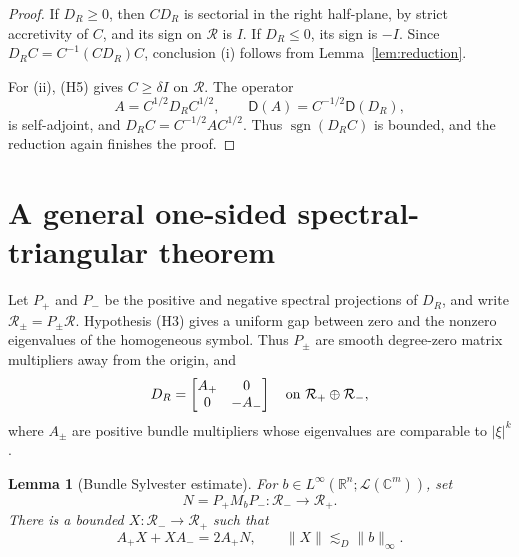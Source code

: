 \documentclass[11pt]{article}
\newtheorem{lemma}{Lemma}
\newcommand{\Rr}{\mathcal R}
\newcommand{\Dom}{\mathsf D}
\newcommand{\sgn}{\operatorname{sgn}}
\begin{document}
\begin{proof}
If $D_R\geq0$, then $CD_R$ is sectorial in the right half-plane, by strict
accretivity of $C$, and its sign on $\Rr$ is $I$. If $D_R\leq0$, its sign is
$-I$. Since $D_RC=C^{-1}(CD_R)C$, conclusion (i) follows from
Lemma~\ref{lem:reduction}.

For (ii), (H5) gives $C\geq\delta I$ on $\Rr$. The operator
\[
 A=C^{1/2}D_RC^{1/2},
 \qquad \Dom(A)=C^{-1/2}\Dom(D_R),
\]
is self-adjoint, and
$D_RC=C^{-1/2}AC^{1/2}$. Thus $\sgn(D_RC)$ is bounded, and the reduction
again finishes the proof.
\end{proof}

\section*{A general one-sided spectral-triangular theorem}
Let $P_+$ and $P_-$ be the positive and negative spectral projections of
$D_R$, and write $\Rr_\pm=P_\pm\Rr$.  Hypothesis (H3) gives a uniform gap
between zero and the nonzero eigenvalues of the homogeneous symbol.  Thus
$P_\pm$ are smooth degree-zero matrix multipliers away from the origin, and
\[
 D_R=\begin{bmatrix}A_+&0\\0&-A_-\end{bmatrix}
 \quad\hbox{on }\Rr_+\oplus\Rr_-,
\]
where $A_\pm$ are positive bundle multipliers whose eigenvalues are comparable
to $|\xi|^k$.

\begin{lemma}[Bundle Sylvester estimate]\label{lem:sylvester}
For $b\in L^\infty(\mathbb R^n;\mathcal L(\mathbb C^m))$, set
\[
 N=P_+M_bP_-\colon\Rr_-\longrightarrow\Rr_+.
\]
There is a bounded $X\colon\Rr_-\to\Rr_+$ such that
\begin{equation}\label{eq:sylvester}
 A_+X+XA_-=2A_+N,
 \qquad \|X\|\lesssim_D\|b\|_\infty.
\end{equation}
\end{lemma}
\end{document}
